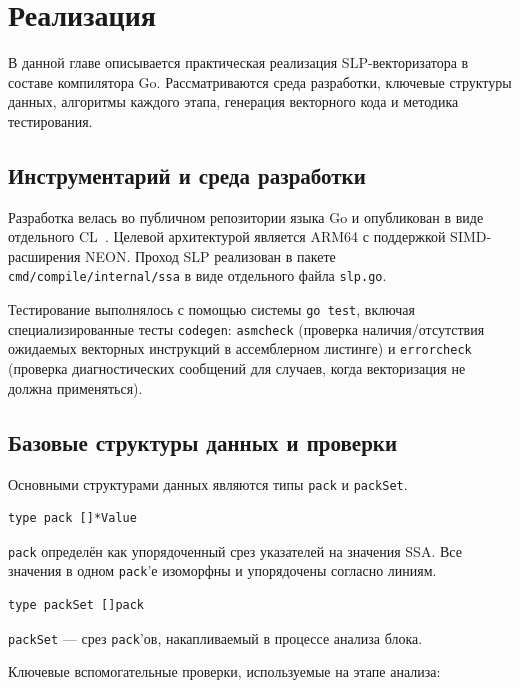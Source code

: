 \section{Реализация}
\label{sec:Chapter6} 

В данной главе описывается практическая реализация SLP-векторизатора в составе компилятора Go. 
Рассматриваются среда разработки, ключевые структуры данных, алгоритмы каждого этапа, генерация векторного кода и методика тестирования.

\subsection{Инструментарий и среда разработки}
\label{sec:dev_env}

Разработка велась во публичном репозитории языка Go и опубликован в виде отдельного CL~\cite{go_cl_783220}. 
Целевой архитектурой является ARM64 с поддержкой SIMD-расширения NEON.
Проход SLP реализован в пакете \texttt{cmd/compile/internal/ssa} в виде отдельного файла \texttt{slp.go}. 

Тестирование выполнялось с помощью системы \texttt{go test}, 
включая специализированные тесты \texttt{codegen}: \texttt{asmcheck} (проверка наличия/отсутствия ожидаемых векторных инструкций в ассемблерном листинге) и 
\texttt{errorcheck} (проверка диагностических сообщений для случаев, когда векторизация не должна применяться).

\subsection{Базовые структуры данных и проверки}
\label{sec:data_structures}

Основными структурами данных являются типы \texttt{pack} и \texttt{packSet}.

\begin{verbatim}
type pack []*Value
\end{verbatim}

\texttt{pack} определён как упорядоченный срез указателей на значения SSA. Все значения в одном \texttt{pack}'е изоморфны и упорядочены согласно линиям.

\begin{verbatim}
type packSet []pack
\end{verbatim}

\texttt{packSet} --- срез \texttt{pack}'ов, накапливаемый в процессе анализа блока.

Ключевые вспомогательные проверки, используемые на этапе анализа:

